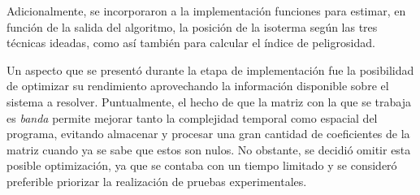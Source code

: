         Adicionalmente, se incorporaron a la implementación funciones para estimar, en función de la salida del algoritmo, la posición de la isoterma según las tres técnicas ideadas, como así también para calcular el índice de peligrosidad.

        Un aspecto que se presentó durante la etapa de implementación fue la posibilidad de optimizar su rendimiento aprovechando la información disponible sobre el sistema a resolver. Puntualmente, el hecho de que la matriz con la que se trabaja es \emph{banda} permite mejorar tanto la complejidad temporal como espacial del programa, evitando almacenar y procesar una gran cantidad de coeficientes de la matriz cuando ya se sabe que estos son nulos. No obstante, se decidió omitir esta posible optimización, ya que se contaba con un tiempo limitado y se consideró preferible priorizar la realización de pruebas experimentales.
